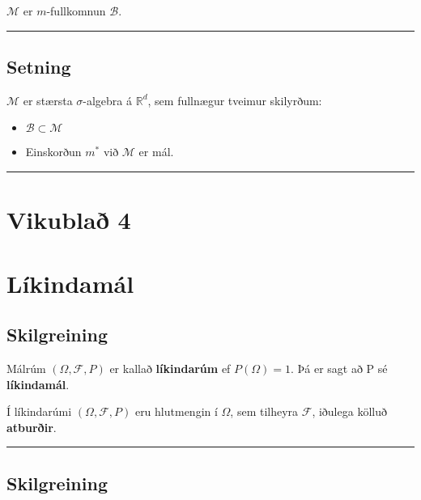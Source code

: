 \documentclass[]{book}
\begin{document}
\(\mathcal M\) er \(m\)-fullkomnun \(\mathcal B\).

\begin{center}\rule{0.5\linewidth}{\linethickness}\end{center}

\hypertarget{setning-31}{%
\section{Setning}\label{setning-31}}

\(\mathcal M\) er stærsta \(\sigma\)-algebra á \(\mathbb R^d\), sem fullnægur tveimur skilyrðum:

\begin{itemize}
\item
  \(\mathcal B \subset \mathcal M\)
\item
  Einskorðun \(m^*\) við \(\mathcal M\) er mál.
\end{itemize}

\begin{center}\rule{0.5\linewidth}{\linethickness}\end{center}

\hypertarget{vikubla-4}{%
\chapter*{Vikublað 4}\label{vikubla-4}}

\hypertarget{likindamal}{%
\chapter{Líkindamál}\label{likindamal}}

\hypertarget{skilgreining-10}{%
\section{Skilgreining}\label{skilgreining-10}}

Málrúm \((\Omega, \mathcal F, P)\) er kallað \textbf{líkindarúm} ef \(P(\Omega) = 1\). Þá er sagt að P sé \textbf{líkindamál}.

Í líkindarúmi \((\Omega, \mathcal F, P)\) eru hlutmengin í \(\Omega\), sem tilheyra \(\mathcal F\), iðulega kölluð \textbf{atburðir}.

\begin{center}\rule{0.5\linewidth}{\linethickness}\end{center}

\hypertarget{skilgreining-11}{%
\section{Skilgreining}\label{skilgreining-11}}
\end{document}
